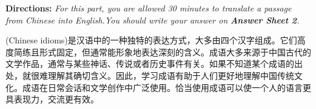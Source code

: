 \documentclass[UTF8,11pt]{ctexart}
\begin{document}
\textbf{Directions:}\textit{ For this part, you are allowed 30 minutes to translate a passage from Chinese into English.You should} \textit{write your answer on}\textbf{\textit{ Answer Sheet 2}}\textit{.}


(Chinese idioms)是汉语中的一种独特的表达方式，大多由四个汉字组成。它们高度简练且形式固定，但通常能形象地表达深刻的含义。成语大多来源于中国古代的文学作品，通常与某些神话、传说或者历史事件有关。如果不知道某个成语的出处，就很难理解其确切含义。因此，学习成语有助于人们更好地理解中国传统文化。成语在日常会话和文学创作中广泛使用。恰当使用成语可以使一个人的语言更具表现力，交流更有效。
\end{document}
